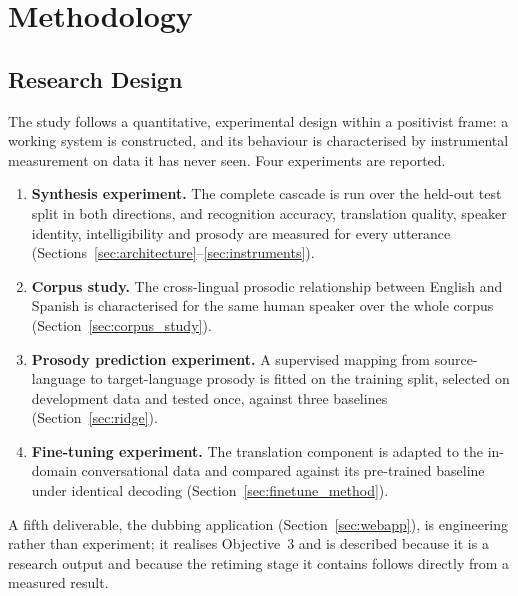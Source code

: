 \chapter{Methodology}
\label{ch:methodology}

\section{Research Design}
\label{sec:design}

The study follows a quantitative, experimental design within a positivist frame: a working system
is constructed, and its behaviour is characterised by instrumental measurement on data it has never
seen. Four experiments are reported.

\begin{enumerate}[label=\textbf{E\arabic*.}]
  \item \textbf{Synthesis experiment.} The complete cascade is run over the held-out test split in
        both directions, and recognition accuracy, translation quality, speaker identity,
        intelligibility and prosody are measured for every utterance
        (Sections~\ref{sec:architecture}--\ref{sec:instruments}).
  \item \textbf{Corpus study.} The cross-lingual prosodic relationship between English and Spanish
        is characterised for the same human speaker over the whole corpus
        (Section~\ref{sec:corpus_study}).
  \item \textbf{Prosody prediction experiment.} A supervised mapping from source-language to
        target-language prosody is fitted on the training split, selected on development data and
        tested once, against three baselines (Section~\ref{sec:ridge}).
  \item \textbf{Fine-tuning experiment.} The translation component is adapted to the in-domain
        conversational data and compared against its pre-trained baseline under identical decoding
        (Section~\ref{sec:finetune_method}).
\end{enumerate}

A fifth deliverable, the dubbing application (Section~\ref{sec:webapp}), is engineering rather than
experiment; it realises Objective~3 and is described because it is a research output and because
the retiming stage it contains follows directly from a measured result.

